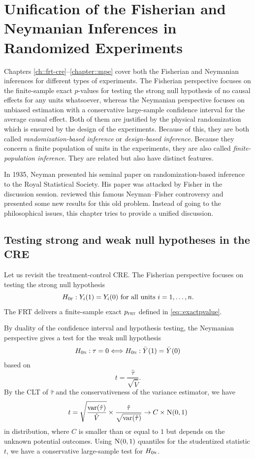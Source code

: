 \chapter{Unification of the Fisherian and Neymanian Inferences in Randomized Experiments}\label{chapter::unification-fisher-neyman}


Chapters \ref{ch::frt-cre}--\ref{chapter::mpe} cover both the Fisherian and Neymanian inferences for different types of experiments. The Fisherian perspective focuses on the finite-sample exact $p$-values for testing the strong null hypothesis of no causal effects for any units whatsoever, whereas the Neymanian perspective focuses on unbiased estimation with a conservative large-sample confidence interval for the average causal effect. Both of them are justified by the physical randomization which is ensured by the design of the experiments. Because of this, they are both called {\it randomization-based inference} or {\it design-based inference}. Because they concern a finite population of units in the experiments, they are also called {\it finite-population inference}.  They are related but also have distinct features. 

In 1935, Neyman presented his seminal paper on randomization-based inference to the Royal Statistical Society. His paper \citep{neyman1935statistical} was attacked by Fisher in the discussion session. \cite{sabbaghi2014comments} reviewed this famous Neyman--Fisher controversy and presented some new results for this old problem. Instead of going to the philosophical issues, this chapter tries to provide a unified discussion. 



\section{Testing strong and weak null hypotheses in the CRE} 
 \label{sec::strong-weak-cre-frt}
 
 
Let us revisit the treatment-control CRE.  The Fisherian perspective focuses on testing the strong null hypothesis
$$
H_{0\textsc{f}}: Y_i(1) = Y_i(0) \text{ for all units } i=1,\ldots, n.
$$
The FRT delivers a finite-sample exact $p_{\textsc{frt}}$ defined in \eqref{eq::exactpvalue}. 
 
 
By duality of the confidence interval and hypothesis testing, the Neymanian perspective gives a test for the  weak null hypothesis
$$
H_{0\textsc{n}} : \tau = 0  \Longleftrightarrow H_{0\textsc{n}}: \bar{Y}(1) = \bar{Y}(0)
$$ 
based on 
$$
t= 
\frac{\hat{\tau} }{  \sqrt{  \hat{V}    } }  .
$$
By the CLT of $\hat\tau$ and the conservativeness of the variance estimator, we have 
$$
t  =   \sqrt{  \frac{ \var(\hat{\tau}) }{ \hat{V} } } \times  \frac{\hat{\tau} }{  \sqrt{  \var(\hat{\tau})   } }    \rightarrow  C \times   \N01 
$$
in distribution, where $C$ is smaller than or equal to $1$ but depends on the unknown potential outcomes. Using $\N01$ quantiles for the studentized statistic $t$, we have a conservative large-sample test for $H_{0\textsc{n}}$. 

